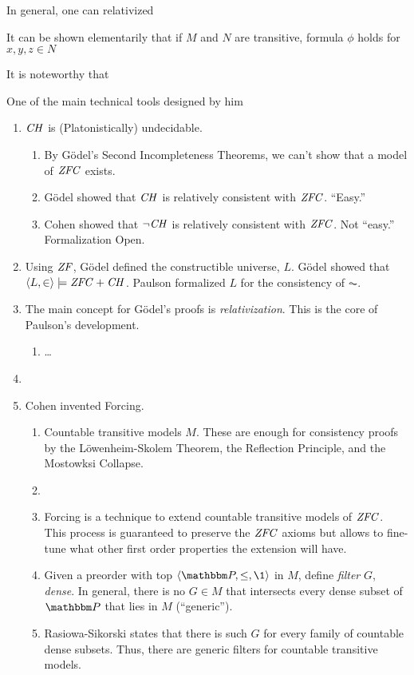 In general, one can relativized

It can be shown elementarily that if $M$ and $N$ are transitive,
formula $\phi$ holds for $x,y,z\in N$ 

It is noteworthy that 



 One of the main
technical tools designed by him 


  
\begin{enumerate}
\item $\mathit{CH}$ is (Platonistically) undecidable.
  \begin{enumerate}
  \item By G\"odel's Second Incompleteness Theorems, we can't show
    that a model of $\mathit{ZFC}$ exists.
  \item G\"odel showed that $\mathit{CH}$ is relatively consistent with
    $\mathit{ZFC}$. ``Easy.''
  \item Cohen showed that  $\neg\mathit{CH}$ is relatively consistent with
    $\mathit{ZFC}$. Not ``easy.'' Formalization Open.
  \end{enumerate}
\item Using $\mathit{ZF}$, G\"odel defined the constructible universe,
  $L$. G\"odel showed that $\langle L,\in\rangle\models \mathit{ZFC}+\mathit{CH}$. Paulson formalized $L$
  for the consistency of $\AC$.
\item The main concept for G\"odel's proofs is
  \emph{relativization}. This is the core of Paulson's development.
  \begin{enumerate}
  \item \dots
  \end{enumerate}
\item 
\item Cohen invented Forcing.
  \begin{enumerate}
  \item Countable transitive models $M$. These are enough for consistency
    proofs by the L\"owenheim-Skolem Theorem, the Reflection
    Principle, and the Mostowksi Collapse.
  \item 
  \item Forcing is a technique to extend countable transitive models of
    $\mathit{ZFC}$. This process is guaranteed to preserve the $\mathit{ZFC}$
    axioms but allows to fine-tune what other first order properties the
    extension will have. 
  \item Given a preorder with top $\lb\PP,\leq,\1\rb$ in $M$, define
    \emph{filter} $G$, \emph{dense}. In general, there is no  $G\in M$
    that intersects every dense
    subset of $\PP$ that lies in $M$ (``generic'').
  \item Rasiowa-Sikorski states that there is such $G$ for every
    family of countable dense subsets. Thus, there are generic filters
    for countable transitive models.
  \end{enumerate}

\end{enumerate}


